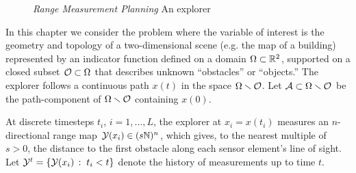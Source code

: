 \begin{figure}
\centering
{}
\caption{\emph{Range Measurement Planning} An explorer \label{fig: grids}}
\end{figure}
In this chapter we consider the problem where the
variable of interest is the geometry and topology of a
two-dimensional scene (e.g. the map of a building) 
represented by an indicator function defined on a domain
$\Omega \subset \mathbb{R}^2$, supported on a closed subset
$\mathcal{O} \subset \Omega$ that describes unknown ``obstacles'' or ``objects.''
The explorer follows a continuous path $x(t)$
in the space $\Omega\smallsetminus\mathcal{O}$.
Let $\mathcal{A} \subset \Omega \smallsetminus \mathcal{O}$ be
the path-component of $\Omega \smallsetminus \mathcal{O}$ containing $x(0)$.

At discrete timesteps $t_i$, $i=1, \ldots, L$, the explorer at $x_i = x(t_i)$ measures an 
$n$-directional range map $\mathcal{Y}(x_i) \in (s\mathbb{N})^n$, %
which gives, to the nearest multiple of $s>0$, the distance 
to the first obstacle along each sensor element's line of sight.  
Let $\mathcal{Y}^t = \{\mathcal{Y}(x_i)\,:\;t_i<t\}$ denote the history of  measurements up to time $t$.  

